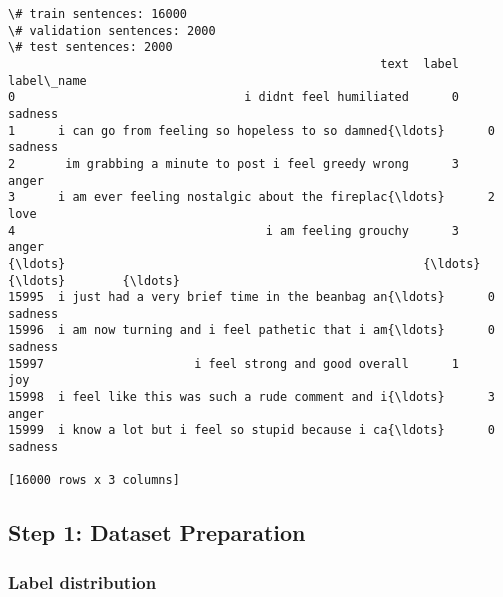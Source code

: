 \documentclass[8pt]{extarticle}
\begin{document}
    \begin{Verbatim}[commandchars=\\\{\}]
\# train sentences: 16000
\# validation sentences: 2000
\# test sentences: 2000
                                                    text  label label\_name
0                                i didnt feel humiliated      0    sadness
1      i can go from feeling so hopeless to so damned{\ldots}      0    sadness
2       im grabbing a minute to post i feel greedy wrong      3      anger
3      i am ever feeling nostalgic about the fireplac{\ldots}      2       love
4                                   i am feeling grouchy      3      anger
{\ldots}                                                  {\ldots}    {\ldots}        {\ldots}
15995  i just had a very brief time in the beanbag an{\ldots}      0    sadness
15996  i am now turning and i feel pathetic that i am{\ldots}      0    sadness
15997                     i feel strong and good overall      1        joy
15998  i feel like this was such a rude comment and i{\ldots}      3      anger
15999  i know a lot but i feel so stupid because i ca{\ldots}      0    sadness

[16000 rows x 3 columns]
    \end{Verbatim}

    \subsection{Step 1: Dataset
Preparation}\label{step-1-dataset-preparation}

    \subsubsection{Label distribution}\label{label-distribution}
\end{document}
